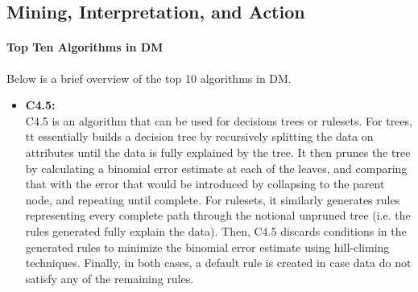 \documentclass[fleqn,10pt]{SelfArx} %
\begin{document}
\subsection{Mining, Interpretation, and Action}

\paragraph{Top Ten Algorithms in DM}
Below is a brief overview of the top 10 algorithms in DM. \cite{Wu:2007:TAD:1327434.1327436}

\begin{itemize}
	\item{\textbf{C4.5:}}\\ C4.5 is an algorithm that can be used for decisions trees or rulesets. For trees, tt essentially builds a decision tree by recursively splitting the data on attributes until the data is fully explained by the tree.  It then prunes the tree by calculating a binomial error estimate at each of the leaves, and comparing that with the error that would be introduced by collapsing to the parent node, and repeating until complete.  For rulesets, it similarly generates rules representing every complete path through the notional unpruned tree (i.e. the rules generated fully explain the data).  Then, C4.5 discards conditions in the generated rules to minimize the binomial error estimate using hill-climing techniques.  Finally, in both cases, a default rule is created in case data do not satisfy any of the remaining rules.
	

\end{itemize}
\end{document}
